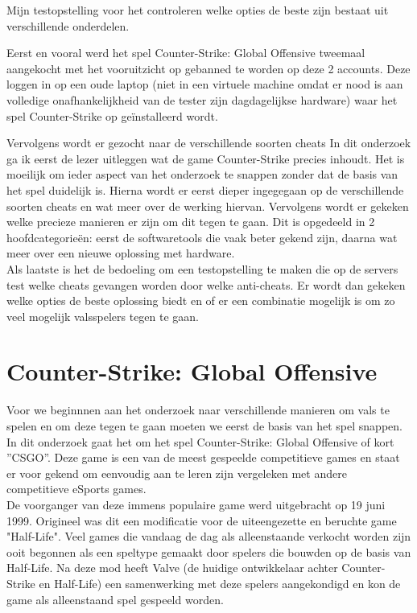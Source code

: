 \documentclass[pdftex,a4paper,12pt,twoside]{report}
\begin{document}
Mijn testopstelling voor het controleren welke opties de beste zijn bestaat uit verschillende onderdelen. 

Eerst en vooral werd het spel Counter-Strike: Global Offensive tweemaal aangekocht met het vooruitzicht op gebanned te worden op deze 2 accounts. Deze loggen in op een oude laptop (niet in een virtuele machine omdat er nood is aan volledige onafhankelijkheid van de tester zijn dagdagelijkse hardware) waar het spel Counter-Strike op geïnstalleerd wordt. 

Vervolgens wordt er gezocht naar de verschillende soorten cheats 
In dit onderzoek ga ik eerst de lezer uitleggen wat de game Counter-Strike precies inhoudt. Het is moeilijk om ieder aspect van het onderzoek te snappen zonder dat de basis van het spel duidelijk is. Hierna wordt er eerst dieper ingegegaan op de verschillende soorten cheats en wat meer over de werking hiervan. Vervolgens wordt er gekeken welke precieze manieren er zijn om dit tegen te gaan. Dit is opgedeeld in 2 hoofdcategorieën: eerst de softwaretools die vaak beter gekend zijn, daarna wat meer over een nieuwe oplossing met hardware. 
\\

Als laatste is het de bedoeling om een testopstelling te maken die op de servers test welke cheats gevangen worden door welke anti-cheats. Er wordt dan gekeken welke opties de beste oplossing biedt en of er een combinatie mogelijk is om zo veel mogelijk valsspelers tegen te gaan. 


\chapter{Counter-Strike: Global Offensive}
\label{ch:csgo}
Voor we beginnnen aan het onderzoek naar verschillende manieren om vals te spelen en om deze tegen te gaan moeten we eerst de basis van het spel snappen. In dit onderzoek gaat het om het spel Counter-Strike: Global Offensive of kort ''CSGO''. Deze game is een van de meest gespeelde competitieve games en staat er voor gekend om eenvoudig aan te leren zijn vergeleken met andere competitieve eSports games. 
\\

De voorganger van deze immens populaire game werd uitgebracht op 19 juni 1999. Origineel was dit een modificatie voor de uiteengezette en beruchte game "Half-Life". Veel games die vandaag de dag als alleenstaande verkocht worden zijn ooit begonnen als een speltype gemaakt door spelers die bouwden op de basis van Half-Life. Na deze mod heeft Valve (de huidige ontwikkelaar achter Counter-Strike en Half-Life) een samenwerking met deze spelers aangekondigd en kon de game als alleenstaand spel gespeeld worden.
\\
\end{document}
